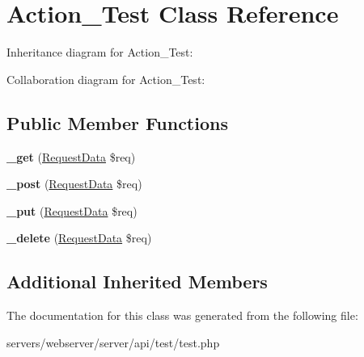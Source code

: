 \hypertarget{class_lora_1_1_api_1_1_action___test}{}\section{Action\+\_\+\+Test Class Reference}
\label{class_lora_1_1_api_1_1_action___test}


Inheritance diagram for Action\+\_\+\+Test\+:


Collaboration diagram for Action\+\_\+\+Test\+:
\subsection*{Public Member Functions}
\begin{DoxyCompactItemize}
\item 
\mbox{\label{class_lora_1_1_api_1_1_action___test_a3ad4bf1b146a3180b34d1327ff2abf69}} 
{\bfseries \+\_\+get} (\hyperlink{class_request_data}{Request\+Data} \$req)
\item 
\mbox{\label{class_lora_1_1_api_1_1_action___test_a50751d47a139282d1c3b08cab1b6562e}} 
{\bfseries \+\_\+post} (\hyperlink{class_request_data}{Request\+Data} \$req)
\item 
\mbox{\label{class_lora_1_1_api_1_1_action___test_a2affcc8f31c13147c33450193b229194}} 
{\bfseries \+\_\+put} (\hyperlink{class_request_data}{Request\+Data} \$req)
\item 
\mbox{\label{class_lora_1_1_api_1_1_action___test_ab8ddc6de1e04524212f7d55893f78864}} 
{\bfseries \+\_\+delete} (\hyperlink{class_request_data}{Request\+Data} \$req)
\end{DoxyCompactItemize}
\subsection*{Additional Inherited Members}


The documentation for this class was generated from the following file\+:\begin{DoxyCompactItemize}
\item 
servers/webserver/server/api/test/test.\+php\end{DoxyCompactItemize}
